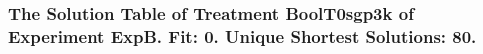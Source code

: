  \begin{frame}
 \fontsize{8pt}{9pt}\selectfont
 \frametitle{ The Solution Table of Treatment BoolT0sgp3k of Experiment ExpB. Fit: 0. Unique Shortest Solutions: 80. }

 \label{ExpBSolutionTable001.tex}  
 \end{frame}

